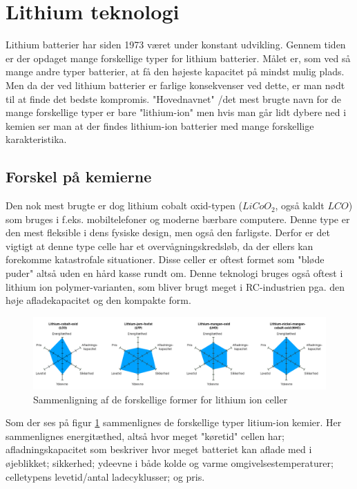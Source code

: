 \section{Lithium teknologi}
Lithium batterier har siden 1973 været under konstant udvikling. Gennem tiden er der opdaget mange forskellige typer for lithium batterier. Målet er, som ved så mange andre typer batterier, at få den højeste kapacitet på mindst mulig plads. Men da der ved lithium batterier er farlige konsekvenser ved dette, er man nødt til at finde det bedste kompromis. "Hovednavnet" \space /det mest brugte navn for de mange forskellige typer er bare "lithium-ion" \space men hvis man går lidt dybere ned i kemien ser man at der findes lithium-ion batterier med mange forskellige karakteristika. 

\subsection{Forskel på kemierne}
Den nok mest brugte er dog lithium cobalt oxid-typen ($LiCoO_2$, også kaldt $LCO$) som bruges i f.eks. mobiltelefoner og moderne bærbare computere. Denne type er den mest fleksible i dens fysiske design, men også den farligste. Derfor er det vigtigt at denne type celle har et overvågningskredsløb, da der ellers kan forekomme katastrofale situationer. Disse celler er oftest formet som "bløde puder" \space \textemdash \space altså uden en hård kasse rundt om. Denne teknologi bruges også oftest i lithium ion polymer-varianten, som bliver brugt meget i RC-industrien pga. den høje afladekapacitet og den kompakte form.

\begin{figure}[h]
	\centering
	\includegraphics[width=15cm]{billeder/chemical-comparison.png}
	\caption{Sammenligning af de forskellige former for lithium ion celler\protect\footnotemark}
	\label{fig:lithium_variants_comparison}
\end{figure}

Som der ses på figur \ref{fig:lithium_variants_comparison} sammenlignes de forskellige typer litium-ion kemier. Her sammenlignes energitæthed, altså hvor meget "køretid" \space cellen har; afladningskapacitet som beskriver hvor meget batteriet kan aflade med i øjeblikket; sikkerhed; ydeevne i både kolde og varme omgivelsestemperaturer; celletypens levetid/antal ladecyklusser; og pris. \\


